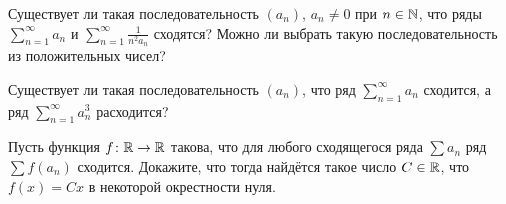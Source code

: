\documentclass[a4paper,11pt]{article}
\begin{document}

Существует ли такая последовательность $(a_n)$, $a_n\ne0$ при $n\in\mathbb{N}$,
что ряды $\sum\limits_{n=1}^\infty a_n$ и
$\sum\limits_{n=1}^\infty \frac1{n^2a_n}$ сходятся?
Можно ли выбрать такую последовательность из
положительных чисел?


Существует ли такая последовательность $(a_n)$, что
ряд $\sum\limits_{n=1}^\infty a_n$ сходится, а ряд
$\sum\limits_{n=1}^\infty a_n^3$ расходится?




Пусть функция $f\colon\mathbb{R}\rightarrow\mathbb{R}$ такова, что для любого сходящегося
ряда $\sum a_n$ ряд $\sum f(a_n)$ сходится. Докажите, что тогда найдётся
такое число $C\in\mathbb{R}$, что $f(x)=Cx$ в некоторой окрестности нуля.

\end{document}
